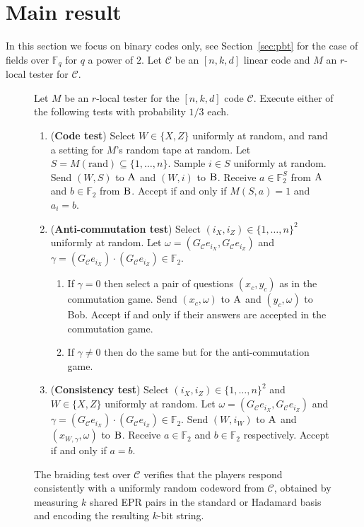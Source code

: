 \documentclass[11pt]{article}
\theoremstyle{definition}
\newcommand{\code}{\mathcal{C}}
\newcommand{\field}{\mathbb{F}_2}
\newcommand{\F}{\ensuremath{\mathbb{F}}}
\newcommand{\rand}{\textrm{rand}}
\newcommand{\labelstyle}[1]{\ensuremath{\textsc{#1}}\xspace}
\newcommand{\alice}{\labelstyle{A}}
\newcommand{\bob}{\labelstyle{B}}
\newenvironment{gamespec}{
  \begin{mdframed}[style=figstyle]}{
  \end{mdframed}}
\begin{document}
\section{Main result}

In this section we focus on binary codes only, see Section~\ref{sec:pbt} for the case of fields over $\F_q$ for $q$ a power of $2$. Let $\code$ be an $[n,k,d]$ linear code and $M$ an $r$-local tester for $\code$. 


\begin{figure}[!htbp]
  \centering
  \begin{gamespec}
Let $M$ be an $r$-local tester for the $[n,k,d]$ code $\code$.  Execute either of the following tests with probability $1/3$ each. 
    \begin{enumerate}
      \setlength\itemsep{1pt}
    \item (\textbf{Code test}) Select $W\in \{X,Z\}$ uniformly at random, and $\rand$ a setting for $M$'s random tape at random. Let $S=M(\rand)\subseteq\{1,\ldots,n\}$. Sample $i\in S$ uniformly at random. Send $(W,S)$ to $\alice$ and $(W,i)$ to $\bob$. Receive $a\in \field^S$ from $\alice$ and $b\in \field$ from $\bob$. Accept if and only if $M(S,a)=1$ and $a_i = b$.  
    \item (\textbf{Anti-commutation test}) Select $(i_X,i_Z)\in \{1,\ldots,n\}^2 $ uniformly at random. Let $\omega = (G_\code e_{i_X}, G_\code e_{i_Z})$ and $\gamma =  (G_\code e_{i_X}) \cdot(G_\code e_{i_Z}) \in \field$.
		\begin{enumerate}
		\item If $\gamma=0$ then select a pair of questions $(x_c,y_c)$ as in the commutation game. Send $(x_c,\omega)$ to $\alice$ and $(y_c,\omega)$ to Bob. Accept if and only if their answers are accepted in the commutation game. 
		\item If $\gamma\neq 0$ then do the same but for the anti-commutation game. 
		\end{enumerate} 
		 \item (\textbf{Consistency test}) Select $(i_X,i_Z)\in \{1,\ldots,n\}^2 $ and $W\in \{X,Z\}$ uniformly at random. Let $\omega=(G_\code e_{i_X}, G_\code e_{i_Z})$ and $\gamma = (G_\code e_{i_X}) \cdot(G_\code e_{i_Z}) \in \field$. Send $(W,i_W)$ to $\alice$ and $(x_{W,\gamma},\omega)$ to $\bob$. Receive $a\in \field$ and $b\in \field$ respectively. Accept if and only if $a=b$. 
    \end{enumerate}
  \end{gamespec}
  \caption{The braiding test over $\code$ verifies that the players respond consistently with a uniformly random codeword from $\code$, obtained by measuring $k$ shared EPR pairs in the standard or Hadamard basis and encoding the resulting $k$-bit string.}
  \label{fig:braiding-test}
\end{figure}
\end{document}
